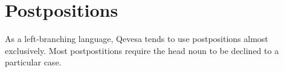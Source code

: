 \documentclass[grammar]{subfiles}
\begin{document}
%


\section{Postpositions}
\label{sec:nm_postpositions}

As a left-branching language, Qevesa tends to use postpositions almost
exclusively.  Most postpostitions require the head noun to be declined to a
particular case.
\end{document}
